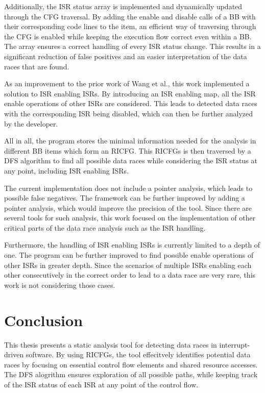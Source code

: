 \documentclass[
fancyheadings, %
%
%
]{stsreprt}
\begin{document}
{Additionally, the \ac{ISR} status array is implemented and dynamically updated through the \ac{CFG} traversal. By adding the enable and disable calls of a \acl{BB} with their corresponding code lines to the item, an efficient way of traversing through the \ac{CFG} is enabled while keeping the execution flow correct even within a \acl{BB}. The array ensures a correct handling of every \ac{ISR} status change. This results in a significant reduction of false positives and an easier interpretation of the data races that are found.

As an improvement to the prior work of Wang et al., this work implemented a solution to \ac{ISR} enabling \acp{ISR}. By introducing an \ac{ISR} enabling map, all the \ac{ISR} enable operations of other \acp{ISR} are considered. This leads to detected data races with the corresponding \ac{ISR} being disabled, which can then be further analyzed by the developer.

All in all, the program stores the minimal information needed for the analysis in different \acl{BB} items which form an \ac{RICFG}. This \acp{RICFG} is then traversed by a \ac{DFS} algorithm to find all possible data races while considering the \ac{ISR} status at any point, including \ac{ISR} enabling \acp{ISR}.

The current implementation does not include a pointer analysis, which leads to possible false negatives. The framework can be further improved by adding a pointer analysis, which would improve the precision of the tool. Since there are several tools for such analysis, this work focused on the implementation of other critical parts of the data race analysis such as the \ac{ISR} handling.

Furthermore, the handling of \ac{ISR} enabling \acp{ISR} is currently limited to a depth of one. The program can be further improved to find possible enable operations of other \acp{ISR} in greater depth. Since the scenarios of multiple \acp{ISR} enabling each other consecutively in the correct order to lead to a data race are very rare, this work is not considering those cases.

 
\chapter{Conclusion}
This thesis presents a static analysis tool for detecting data races in interrupt-driven software. By using \aclp{RICFG}, the tool effecitvely identifies potential data races by focusing on essential control flow elements and shared resource accesses. The \ac{DFS} alogrithm ensures exploration of all possible paths, while keeping track of the \ac{ISR} status of each \ac{ISR} at any point of the control flow.

}
\end{document}

